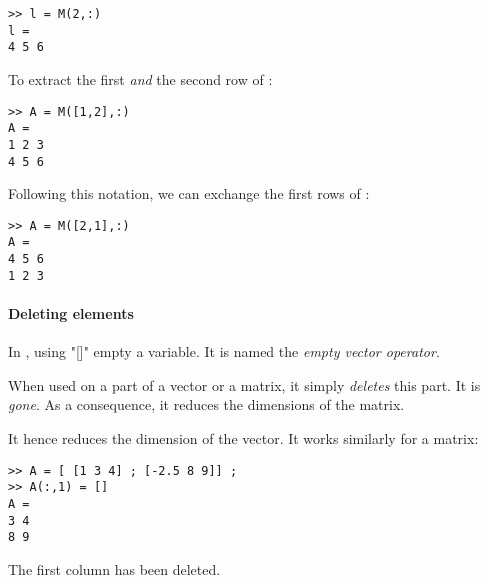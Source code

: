 \begin{lstlisting}
>> l = M(2,:)
l = 
4 5 6
\end{lstlisting}

To extract the first \emph{and} the second row of :
\begin{lstlisting}
>> A = M([1,2],:)
A = 
1 2 3
4 5 6
\end{lstlisting}

Following this notation, we can exchange the first rows of :
\begin{lstlisting}
>> A = M([2,1],:)
A = 
4 5 6
1 2 3
\end{lstlisting}





\paragraph{Deleting elements}




In \matlab, using "[]" empty a variable. It is named the \emph{empty vector operator}.
	
When used on a part of a vector or a matrix, it simply \emph{deletes} this part.
It is \emph{gone}.
As a consequence, it reduces the dimensions of the matrix.



It hence reduces the dimension of the vector. It works similarly for a matrix:
\begin{lstlisting}
>> A = [ [1 3 4] ; [-2.5 8 9]] ;
>> A(:,1) = []
A = 
3 4
8 9
\end{lstlisting}
The first column has been deleted.



